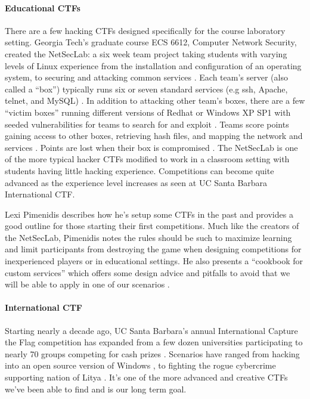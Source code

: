 \documentclass[10pt]{article}
\begin{document}
\paragraph*{Educational CTFs} There are a few hacking CTFs designed specifically
for the course laboratory setting. Georgia Tech's graduate course ECS 6612,
Computer Network Security, created the NetSecLab: a six week team project
taking students with varying levels of Linux experience from the installation
and configuration of an operating system, to securing and attacking common
services \cite{NetSecLab}. Each team's server (also called a ``box'') typically
runs six or seven standard services (e.g ssh, Apache, telnet, and MySQL)
\cite{NetSecLab}. In addition to attacking other team's boxes, there are a few
``victim boxes'' running different versions of Redhat or Windows XP SP1 with
seeded vulnerabilities for teams to search for and exploit \cite{NetSecLab}.
Teams score points gaining access to other boxes, retrieving hash files, and
mapping the network and services \cite{NetSecLab}. Points are lost when their
box is compromised \cite{NetSecLab}. The NetSecLab is one of the more typical
hacker CTFs modified to work in a classroom setting with students having little
hacking experience. Competitions can become quite advanced as the experience
level increases as seen at UC Santa Barbara International CTF.

Lexi Pimenidis describes how he's setup some CTFs in the past
\cite{HostingHackingChallenge} and provides a good outline for those starting
their first competitions. Much like the creators of the NetSecLab, Pimenidis
notes the rules should be such to maximize learning and limit participants from
destroying the game when designing competitions for inexperienced players or in
educational settings. He also presents a ``cookbook for custom services'' which
offers some design advice and pitfalls to avoid that we will be able to apply
in one of our scenarios \cite{HostingHackingChallenge}.

\paragraph*{International CTF} Starting nearly a decade ago, UC Santa Barbara's
annual International Capture the Flag competition has expanded from a few dozen
universities participating to nearly 70 groups competing for cash prizes
\cite{2010iCTF}. Scenarios have ranged from hacking into an open source version
of Windows \cite{UCSBWindows}, to fighting the rogue cybercrime supporting
nation of Litya \cite{2010iCTF}. It's one of the more advanced and creative CTFs
we've been able to find and is our long term goal.
\end{document}
